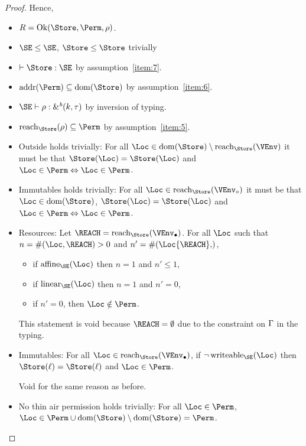 \begin{proof}
  Hence,
  \begin{itemize}
  \item $R=\Ok{\Store, \Perm, \rho}$.
  \item $\SE \le \SE$, $\Store \le \Store$ trivially
  \item $\vdash \Store : \SE$ by assumption~\ref{item:7}.
  \item $\Addresses{\Perm} \subseteq \Dom{\Store}$ by
    assumption~\ref{item:6}.
  \item $\SE \vdash \rho : \borrowty{k}{\tau}$ by inversion of typing.
  \item $\Reach{\Store}{\rho} \subseteq \Perm$ by assumption~\ref{item:5}.
  \item Outside holds trivially: For all $\Loc \in \Dom{\Store} \setminus
    \Reach{\Store}{\VEnv}$ it must be that 
    $\Store (\Loc) = \Store (\Loc)$
    and $\Loc\in\Perm \Leftrightarrow \Loc\in\Perm$.
  \item Immutables holds trivially: For all $\Loc \in
    \Reach{\Store}{\ImmutableBorrows\VEnv}$ it must be that
    $\Loc\in\Dom\Store$, 
    $\Store (\Loc) = \Store (\Loc)$
    and $\Loc\in\Perm \Leftrightarrow \Loc\in\Perm$.
  \item Resources:
    Let $\REACH =\Reach{\Store}{\Active\VEnv}$.
    For all $\Loc$ such that $n= \MultiNumber\Loc\REACH >0$ and $n' =
    \MultiNumber\Loc{\REACH}$, 
    \begin{itemize}
    \item if $\Affine{\SE}\Loc$ then $n=1$ and $n'\le 1$,
    \item if $\Linear{\SE}\Loc$ then $n=1$ and $n' = 0$,
    \item if $n'=0$, then $\Loc\notin\Perm$.
    \end{itemize}

    This statement is void because $\REACH=\emptyset$ due to the
    constraint on $\Gamma$ in the typing.
  \item Immutables: For all $\Loc \in \Reach
    {\Store}{\Active\VEnv}$, if $\neg\Writeable{\SE}\Loc$ then
    $\Store (\ell) = \Store (\ell)$ and $\Loc\in \Perm$.

    Void for the same reason as before.
  \item No thin air permission holds trivially: For all $\Loc\in \Perm$, $\Loc
    \in \Perm \cup  \Dom{\Store} \setminus \Dom{\Store} = \Perm$.
  \end{itemize}
  

\end{proof}
\clearpage


